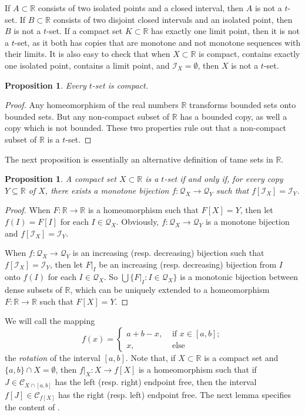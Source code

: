 \documentclass[12pt,a4paper,leqno]{amsart}
\newtheorem{pro}[thm]{Proposition}
\theoremstyle{definition}
\begin{document}
If $A\subset \mathbb R$ consists of two isolated points and a closed interval, then $A$ is not a $ t $-set. If $B\subset \mathbb R$ consists of two disjoint closed intervals and an  isolated point, then $B$ is not a $ t $-set. If a compact set $K\subset \mathbb R$ has exactly one limit point, then it is not a $ t $-set, as it both has copies that are  monotone and not monotone sequences with their limits. It is also easy to check that when $X \subset \mathbb R$ is compact,  contains exactly one isolated point,  contains a limit point, and $\mathcal I_X=\emptyset $, then $X$ is not a $ t $-set.

\begin{pro}\label{po6} Every $ t $-set is compact. \end{pro}
\begin{proof} Any homeomorphism of the real  numbers $\mathbb R$  transforms bounded sets onto bounded sets. But any non-compact subset 
of $\mathbb R$ has a bounded copy, as well a copy which is not bounded. These two properties rule out that a non-compact subset of $\mathbb R$ is a $ t $-set. 
 \end{proof}

The next proposition is essentially an alternative definition of tame sets in $\mathbb R$.

\begin{pro}\label{co7} A compact set $X\subset \mathbb R$ is a $ t $-set if and only if, for every copy $Y\subseteq \mathbb R $ of $X$, there exists a monotone bijection $f\colon \mathcal Q_X \to \mathcal Q_Y$ such that $f[\mathcal I_X]=\mathcal I_Y$. \end{pro}
\begin{proof}  
When  $F\colon \mathbb R \to \mathbb R$ is a homeomorphism such that $F[X]=Y$, then let $f(I)=F[I]$ for each $I\in \mathcal Q_X$. Obviously,  $f\colon \mathcal Q_X \to \mathcal Q_Y$ is a monotone bijection  and $f[\mathcal I_X]=\mathcal I_Y$. 

When $f\colon \mathcal Q_X \to \mathcal Q_Y$ is an increasing (resp. decreasing) bijection  such that $f[\mathcal I_X]=\mathcal I_Y$,  then 
let $F|_I$ be an increasing (resp. decreasing) bijection  from $I$ onto $f(I)$ for each $I \in \mathcal Q_X$. So $\bigcup \{ F|_I \colon I \in \mathcal Q_X\}$ is a monotonic bijection between dense subsets of $ \mathbb R $, which can be uniquely extended to a homeomorphism 
$F\colon \mathbb R \to \mathbb R$   such that $F[X]=Y$.
 \end{proof}


We will call the mapping $$f(x)=\begin{cases} a+b-x, & \mbox{ if } x\in [a,b];\\
x,& \mbox { else } \end{cases}  $$  the \textit{rotation} of the interval $[a,b]$. Note that, if $X\subset \mathbb R$ is a compact set and $\{a,b\} \cap X =\emptyset$, then $f|_X \colon X \to f[X]$ is a homeomorphism such that if  $J\in \mathcal C_{X\cap [a,b]}$ has  the left (resp. right) endpoint free, then the interval $f[J]\in \mathcal C_{f[X]}$ has  the right (resp. left) endpoint free. The next lemma  specifies the content of \cite[Remark 8]{bkp}.
\end{document}
